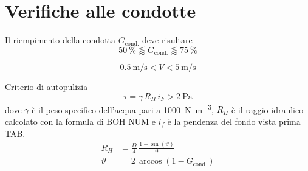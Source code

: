 \chapter{Verifiche alle condotte}

Il riempimento della condotta $G_\text{cond.}$ deve risultare 
\begin{equation}
    \SI{50}{\percent} \lessapprox G_\text{cond.} \lessapprox\SI{75}{\percent}
\end{equation}


\begin{equation}
    \SI{0.5}{\metre\per\second} < V <  \SI{5}{\metre\per\second}
\end{equation}

Criterio di autopulizia
\begin{equation}
    \tau = \gamma \, R_H \, i_F > \SI{2}{\pascal}
\end{equation}
dove $\gamma$ è il peso specifico dell'acqua pari a \SI{1000}{\newton\per\metre\cubed}, $R_H$ è il raggio idraulico calcolato con la formula di BOH NUM e $i_f$ è la pendenza del fondo vista prima TAB.  
\begin{align}
    R_H &= \frac{D}{4} \, \frac{1 - \sin(\vartheta)}{\vartheta} \\
    \vartheta &= 2 \, \arccos(1 - G_\text{cond.})
\end{align}

